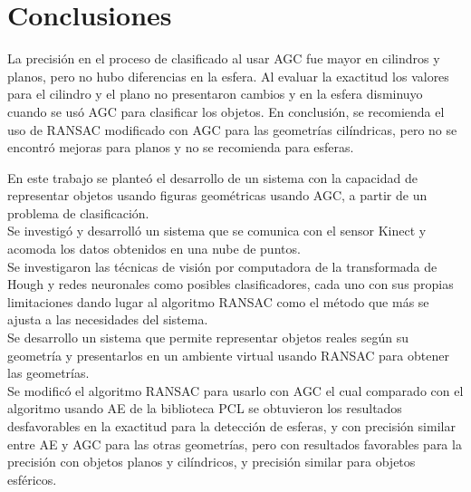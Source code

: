
\section{Conclusiones}


La precisión en el proceso de clasificado al usar AGC fue mayor en cilindros y planos, pero no hubo diferencias en la esfera. Al evaluar la exactitud los valores para el cilindro y el plano no presentaron cambios y en la esfera disminuyo cuando se usó AGC para clasificar los objetos. En conclusión, se recomienda el uso de RANSAC modificado con AGC para las geometrías cilíndricas, pero no se encontró mejoras para planos y no se recomienda para esferas. 


En este trabajo se planteó el desarrollo de un sistema con la capacidad de representar objetos usando figuras geométricas usando AGC, a partir de un problema de clasificación.\\

Se investigó y desarrolló un sistema que se comunica con el sensor Kinect y acomoda los datos obtenidos en una nube de puntos.\\

Se investigaron las técnicas de visión por computadora de la transformada de Hough y redes neuronales como posibles clasificadores, cada uno con sus propias limitaciones dando lugar al algoritmo RANSAC como el método que más se ajusta a las necesidades del sistema.\\

Se desarrollo un sistema que permite representar objetos reales según su geometría y presentarlos en un ambiente virtual usando RANSAC para obtener las geometrías.\\


Se modificó el algoritmo RANSAC para usarlo con AGC el cual comparado con el algoritmo usando AE de la biblioteca PCL se obtuvieron los resultados desfavorables en la exactitud para la detección de esferas, y con precisión similar entre AE y AGC para las otras geometrías, pero con resultados favorables para la precisión con objetos planos y cilíndricos, y precisión similar para objetos esféricos.\\








